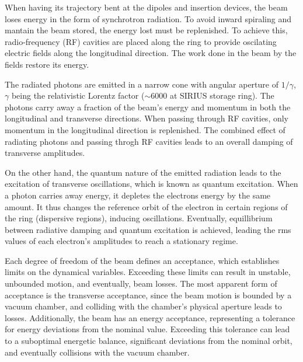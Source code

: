 When having its trajectory bent at the dipoles and insertion devices,
the beam loses energy in the form of synchrotron radiation. To avoid inward spiraling and mantain the beam stored, the energy lost must be replenished. To achieve this, radio-frequency (RF) cavities are placed along the ring to provide oscilating electric fields along the longitudinal direction. The work done in the beam by the fields restore its energy.

The radiated photons are emitted in a narrow cone with angular aperture of $1/\gamma$, $\gamma$ being the relativistic Lorentz factor ($\sim 6000$ at SIRIUS storage ring). The photons carry away a fraction of the beam's energy and momentum in both the longitudinal and transverse directions. When passing through RF cavities, only momentum in the longitudinal direction is replenished. The combined effect of radiating photons and passing throgh RF cavities leads to an overall damping of transverse amplitudes.

On the other hand, the quantum nature of the emitted radiation leads to the excitation of transverse oscillations, which is known as quantum excitation. When a photon carries away energy, it depletes the electrons energy by the same amount. It thus changes the reference orbit of the electron in certain regions of the ring (dispersive regions), inducing oscillations. Eventually, equillibrium between radiative damping and quantum excitation is achieved, leading the rms values of each electron's amplitudes to reach a stationary regime.

Each degree of freedom of the beam defines an acceptance, which establishes limits on the dynamical variables. Exceeding these limits can result in unstable, unbounded motion, and eventually, beam losses. The most apparent form of acceptance is the transverse acceptance, since the beam motion is bounded by a vacuum chamber, and colliding with the chamber's physical aperture leads to losses. Additionally, the beam has an energy acceptance, representing a tolerance for energy deviations from the nominal value. Exceeding this tolerance can lead to a suboptimal energetic balance, significant deviations from the nominal orbit, and eventually collisions with the vacuum chamber.

